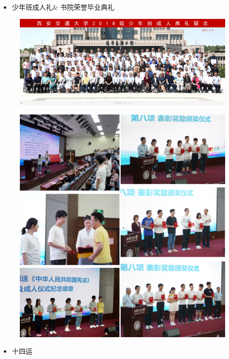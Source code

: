 \documentclass[
decoration,  %
]{qyxf-book}
\begin{document}
	\begin{itemize}
		\item 少年班成人礼\& 书院荣誉毕业典礼
	\end{itemize}
	\begin{figure}[H]
		\centering
		\includegraphics[width=0.6\linewidth]{pics/tuan05.png}
	\end{figure}
	\begin{figure}[H]
		\centering
		\includegraphics[width=0.6\linewidth]{pics/tuan06.png}
	\end{figure}
	
	\begin{itemize}
		\item 十四运
	\end{itemize}
	
\end{document}
